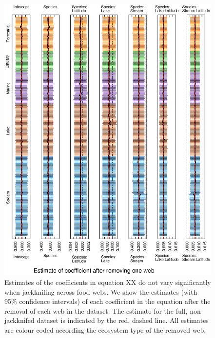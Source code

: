 \documentclass[12pt]{article}
\begin{document}
    \begin{figure}[h]
    \centerline{\includegraphics*[width=.8\textwidth]{Figures/Jackknife/Gen_web.eps}}
    \caption{Estimates of the coefficients in equation XX do not vary significantly
    when jackknifing across food webs. We show the estimates (with 95\% confidence intervals) of each coefficient
    in the equation after the removal of each web in the dataset. The estimate for the full, non-jackknifed
    dataset is indicated by the red, dashed line. All estimates are colour
    coded according the ecosystem type of the removed web.}
    \label{Gen_web}
    \end{figure}
\end{document}
